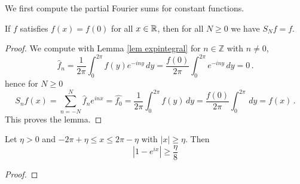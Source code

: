 We first compute the partial Fourier sums for constant functions.


\begin{lemma}\label{constant}
If $f$ satisfies $f(x)=f(0)$ for all $x\in \mathbb{R}$, then for all $N\ge 0$ we have $S_Nf=f$.
    \end{lemma}
\begin{proof}
    We compute with Lemma \ref{lem expintegral} for $n\in \mathbb{Z}$ with $n\neq 0$,
    \begin{equation}
        \widehat{f}_n=\frac 1{2\pi}\int_0^{2\pi}f(y)e^{-iny}\, dy=\frac {f(0)}{2\pi}\int_0^{2\pi}e^{-iny}\, dy=0\, .
    \end{equation}
hence for $N\ge 0$
\begin{equation}
    S_nf(x)=\sum_{n=-N}^N \widehat{f}_n e^{inx}=\widehat{f_0}=\frac{1}{2\pi}\int_0^{2\pi}f(y)\, dy
    =\frac{f(0)}{2\pi}\int_0^{2\pi}\, dy=f(x)\, .
\end{equation}
This proves the lemma.
\end{proof}
\begin{lemma}\label{expbound}
Let $\eta>0$ and $-2\pi +\eta \le  x\le 2\pi-\eta$ with $|x|\ge \eta$. Then
\begin{equation}
    |1-e^{ix}|\ge \frac {\eta}8
\end{equation}
\end{lemma}
\begin{proof}
    \end{proof}

